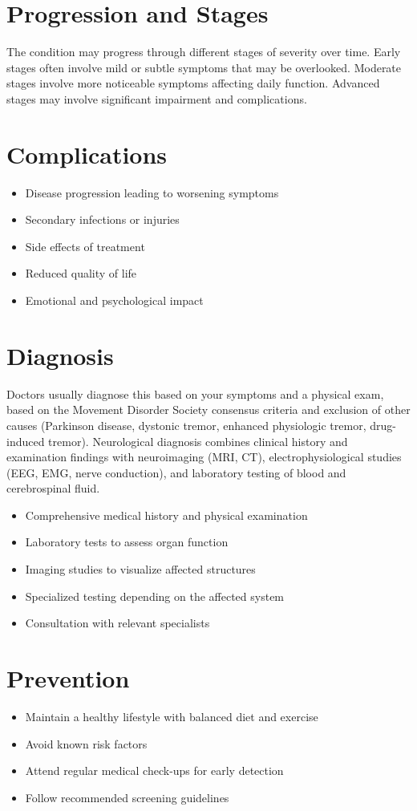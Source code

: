 \section{Progression and Stages}
The condition may progress through different stages of severity over time. Early stages often involve mild or subtle symptoms that may be overlooked. Moderate stages involve more noticeable symptoms affecting daily function. Advanced stages may involve significant impairment and complications.
\section{Complications}
\begin{itemize}[noitemsep]
  \item Disease progression leading to worsening symptoms
  \item Secondary infections or injuries
  \item Side effects of treatment
  \item Reduced quality of life
  \item Emotional and psychological impact
\end{itemize}
\section{Diagnosis}
Doctors usually diagnose this based on your symptoms and a physical exam, based on the Movement Disorder Society consensus criteria and exclusion of other causes (Parkinson disease, dystonic tremor, enhanced physiologic tremor, drug-induced tremor). Neurological diagnosis combines clinical history and examination findings with neuroimaging (MRI, CT), electrophysiological studies (EEG, EMG, nerve conduction), and laboratory testing of blood and cerebrospinal fluid.

\begin{itemize}[noitemsep]
  \item Comprehensive medical history and physical examination
  \item Laboratory tests to assess organ function
  \item Imaging studies to visualize affected structures
  \item Specialized testing depending on the affected system
  \item Consultation with relevant specialists
\end{itemize}
\section{Prevention}
\begin{itemize}[noitemsep]
  \item Maintain a healthy lifestyle with balanced diet and exercise
  \item Avoid known risk factors
  \item Attend regular medical check-ups for early detection
  \item Follow recommended screening guidelines
\end{itemize}
